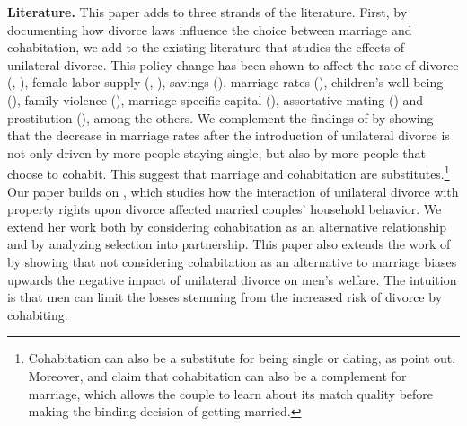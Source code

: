 \documentclass[12pt]{article}
\numberwithin{table}{section}
\begin{document}
\textbf{Literature.} This paper adds to three strands of the literature. First, by documenting how divorce laws influence the choice between marriage and cohabitation, we add to the existing literature that studies the effects of unilateral divorce. This policy change has been shown to affect the rate of divorce (\citealp{friedberg1998}, \citealp{wolfers2006}), female labor supply (\citealp{stevenson2008}, \citealp{voena2015}), savings (\citealp{voena2015}), marriage rates (\citealp{rasul2003,rasul2006}), children's well-being (\citealp{gruber2004}), family violence (\citealp{stevenson2006}), marriage-specific capital (\citealp{stevenson2007}), assortative mating (\citealp{reynoso2019}) and prostitution (\citealp{ciacci2017}), among the others. We complement the findings of \cite{rasul2003,rasul2006} by showing that the decrease in marriage rates after the introduction of unilateral divorce is not only driven by more people staying single, but also by more people that choose to cohabit. This suggest that marriage and cohabitation are substitutes.\footnote{Cohabitation can also be a substitute for being single or dating, as \cite{rindfuss1990} point out. Moreover, \cite{blasutto2020} and \cite{brien2006} claim that cohabitation can also be a complement for marriage, which allows the couple to learn about its match quality before making the binding decision of getting married.} Our paper builds on \cite{voena2015},  which studies how the interaction of unilateral divorce with property rights upon divorce affected married couples' household behavior. We extend her work both by considering cohabitation as an alternative relationship and by analyzing selection into partnership. This paper also extends the work of \cite{fernandez2017} by showing that not considering cohabitation as an alternative to marriage biases upwards the negative impact of unilateral divorce on men's welfare. The intuition is that men can limit the losses stemming from the increased risk of divorce by cohabiting.
\end{document}
